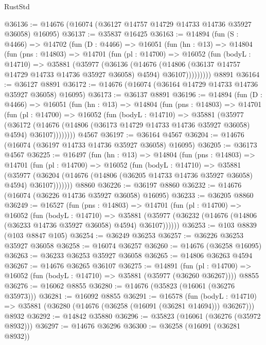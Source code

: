\begin{lexlean}{RustStd}
\begin{coremodule}
@36136 := @14676 (@16074 (@36127 @14757 @14729 @14733 @14736 @35927 @36058) @16095)
@36137 := @35837 @16425
@36163 := @14894
    (fun (S : @4466) =>
    @14702
      (fun (D : @4466) =>
      @16051
        (fun (hn : @13) =>
        @14804
          (fun (pns : @14803) =>
          @14701
            (fun (pl : @14700) =>
            @16052
              (fun (bodyL : @14710) =>
              @35881
                (@35977
                  (@36136
                    (@14676
                      (@14806 (@36137 @14757 @14729 @14733 @14736 @35927 @36058) @4594)
                      @36107)))))))))
    @8891
@36164 := @36127 @8891
@36172 := @14676 (@16074 (@36164 @14729 @14733 @14736 @35927 @36058) @16095)
@36173 := @36137 @8891
@36196 := @14894
    (fun (D : @4466) =>
    @16051
      (fun (hn : @13) =>
      @14804
        (fun (pns : @14803) =>
        @14701
          (fun (pl : @14700) =>
          @16052
            (fun (bodyL : @14710) =>
            @35881
              (@35977
                (@36172
                  (@14676 (@14806 (@36173 @14729 @14733 @14736 @35927 @36058) @4594) @36107))))))))
    @4567
@36197 := @36164 @4567
@36204 := @14676 (@16074 (@36197 @14733 @14736 @35927 @36058) @16095)
@36205 := @36173 @4567
@36225 := @16497
    (fun (hn : @13) =>
    @14804
      (fun (pns : @14803) =>
      @14701
        (fun (pl : @14700) =>
        @16052
          (fun (bodyL : @14710) =>
          @35881
            (@35977
              (@36204 (@14676 (@14806 (@36205 @14733 @14736 @35927 @36058) @4594) @36107)))))))
    @8860
@36226 := @36197 @8860
@36232 := @14676 (@16074 (@36226 @14736 @35927 @36058) @16095)
@36233 := @36205 @8860
@36249 := @16527
    (fun (pns : @14803) =>
    @14701
      (fun (pl : @14700) =>
      @16052
        (fun (bodyL : @14710) =>
        @35881 (@35977 (@36232 (@14676 (@14806 (@36233 @14736 @35927 @36058) @4594) @36107))))))
@36253 := @103 @8839 (@103 @8847 @105)
@36254 := @36249 @36253
@36257 := @36226 @36253 @35927 @36058
@36258 := @16074 @36257
@36260 := @14676 (@36258 @16095)
@36263 := @36233 @36253 @35927 @36058
@36265 := @14806 @36263 @4594
@36267 := @14676 @36265 @36107
@36275 := @14891
    (fun (pl : @14700) => @16052 (fun (bodyL : @14710) => @35881 (@35977 (@36260 @36267))))
    @8855
@36276 := @16062 @8855
@36280 := @14676 (@35823 (@16061 (@36276 @35973)))
@36281 := @16092 @8855
@36291 := @16578
    (fun (bodyL : @14710) => @35881 (@36280 (@14676 (@36258 (@16091 (@36281 @14694))) @36267)))
    @8932
@36292 := @14842 @35880
@36296 := @35823 (@16061 (@36276 (@35972 @8932)))
@36297 := @14676 @36296
@36300 := @36258 (@16091 (@36281 @8932))

\end{coremodule}
\end{lexlean}
